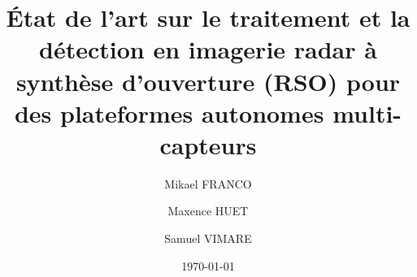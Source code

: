 \documentclass[11pt,a4paper,french]{article}
\begin{document}

		

             

\title{État de l’art sur le traitement et la détection en imagerie radar à synthèse d’ouverture (RSO) pour des plateformes autonomes multi-capteurs}

\author{
	Mikael FRANCO\and
	Maxence HUET\and
	Samuel VIMARE\and
}




\date{\today}

\IMTAfrontcover
\pagestyle{IMTAfancy} %

\IMTAsommaire
\newpage
\IMTAlistefigures  %
\IMTAlistetableaux   %
\newpage
%
\end{document}
